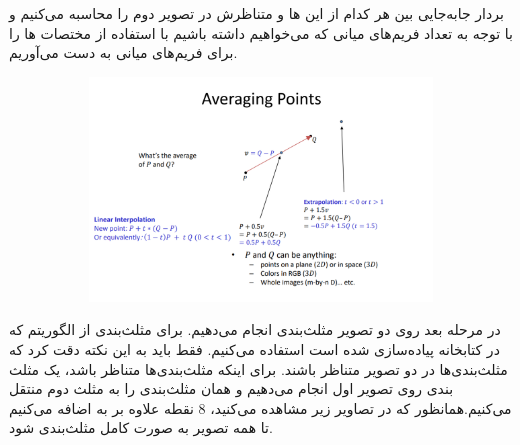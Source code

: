 \documentclass[a4paper,12pt]{article}
\begin{document}
بردار جا‌به‌جایی بین هر کدام از این 
‌ها
و 
متناظرش در تصویر دوم را محاسبه می‌کنیم و با توجه به تعداد فریم‌های میانی که می‌خواهیم داشته باشیم با استفاده از 
مختصات 
‌ها 
را برای فریم‌های میانی به دست می‌آوریم.
\begin{figure}[H]
	\centering
	\begin{subfigure}{0.8\textwidth}
		\centering
		\includegraphics[width=.9\textwidth]{3.png}
	\end{subfigure}
\end{figure}
در مرحله بعد روی دو تصویر مثلث‌بندی انجام می‌دهیم. برای مثلث‌بندی از الگوریتم 
که در کتابخانه 
پیاده‌سازی شده است استفاده می‌کنیم. فقط باید به این نکته دقت کرد که مثلث‌بندی‌ها در دو تصویر متناظر باشند. برای اینکه مثلث‌بندی‌ها متناظر باشد، یک مثلث بندی روی تصویر اول انجام می‌دهیم و همان مثلث‌بندی را به مثلث دوم منتقل می‌کنیم.همانظور که در تصاویر زیر مشاهده می‌کنید، 8 نقطه علاوه بر 
به 
اضافه می‌کنیم تا همه تصویر به صورت کامل مثلث‌بندی شود.
\end{document}
